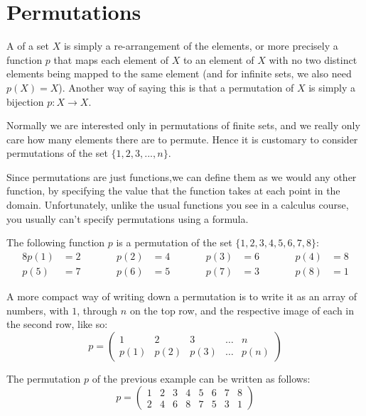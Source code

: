\section{Permutations}

A  of a set $X$ is simply a re-arrangement of
the elements, or more precisely a function $p$ that maps each element of $X$ to
an element of $X$ with no two distinct elements being mapped to the same
element (and for infinite sets, we also need $p(X) = X$).  Another way of
saying this is that a permutation of $X$ is simply a bijection $p: X \to X$.

Normally we are interested only in permutations of finite sets, and we
really only care how many elements there are to permute.  Hence it is
customary to consider permutations of the set $\{1, 2, 3, ..., n\}$.

Since permutations are just functions,we can define them as we would any other
function, by specifying the value that the function takes at each point in the
domain.  Unfortunately, unlike the usual functions you see in a calculus course,
you usually can't specify permutations using a formula.

\begin{example}
  The following function $p$ is a permutation of the set $\{1,2,3,4,5,6,7,8\}$:
  \begin{alignat*}{8}
    p(1) &= 2 &\qquad&
    p(2) &= 4 &\qquad&
    p(3) &= 6 &\qquad&
    p(4) &= 8 \\
    p(5) &= 7 &&
    p(6) &= 5 &&
    p(7) &= 3 &&
    p(8) &= 1  
  \end{alignat*}
\end{example}

A more compact way of writing down a permutation is to write it as an array of
numbers, with $1$, through $n$ on the top row, and the respective image of each
in the second row, like so:
\[
  p = \begin{pmatrix}
    1 & 2 & 3 & \ldots & n \\
    p(1) & p(2) & p(3) & \ldots & p(n)
  \end{pmatrix}
\]

\begin{example}
  The permutation $p$ of the previous example can be written as follows:
  \[
    p = \begin{pmatrix}
      1 & 2 & 3 & 4 & 5 & 6 & 7 & 8 \\
      2 & 4 & 6 & 8 & 7 & 5 & 3 & 1
    \end{pmatrix}
  \]
\end{example}

